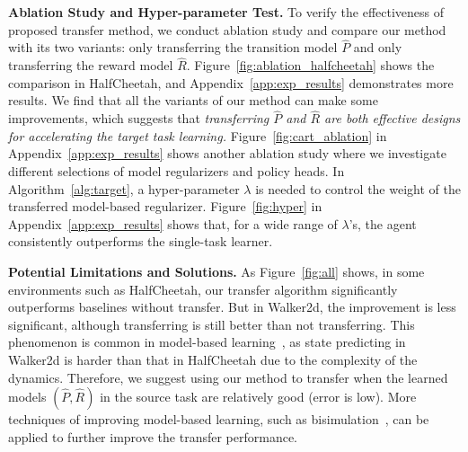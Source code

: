 \textbf{Ablation Study and Hyper-parameter Test.}
To verify the effectiveness of proposed transfer method, we conduct ablation study and compare our method with its two variants: only transferring the transition model $\hat{P}$ and only transferring the reward model $\hat{R}$. Figure~\ref{fig:ablation_halfcheetah} shows the comparison in HalfCheetah, and Appendix~\ref{app:exp_results} demonstrates more results. We find that all the variants of our method can make some improvements, which suggests that \textit{transferring $\hat{P}$ and $\hat{R}$ are both effective designs for accelerating the target task learning.}
Figure~\ref{fig:cart_ablation} in Appendix~\ref{app:exp_results}
shows another ablation study where we investigate different selections of model regularizers and policy heads. 
In Algorithm~\ref{alg:target}, a hyper-parameter $\lambda$ is needed to control the weight of the transferred model-based regularizer. Figure~\ref{fig:hyper} in Appendix~\ref{app:exp_results} shows that, for a wide range of $\lambda$'s, the agent consistently outperforms the single-task learner. 

\textbf{Potential Limitations and Solutions.}
As Figure~\ref{fig:all} shows, in some environments such as HalfCheetah, our transfer algorithm significantly outperforms baselines without transfer. But in Walker2d, the improvement is less significant, although transferring is still better than not transferring.
This phenomenon is common in model-based learning~\citep{nagabandi2018neural}, as state predicting in Walker2d is harder than that in HalfCheetah due to the complexity of the dynamics.
Therefore, we suggest using our method to transfer when the learned models $(\hat{P},\hat{R})$ in the source task are relatively good (error is low).
More techniques of improving model-based learning, such as bisimulation~\citep{zhang2020learning,castro2020scalable}, can be applied to further improve the transfer performance.


